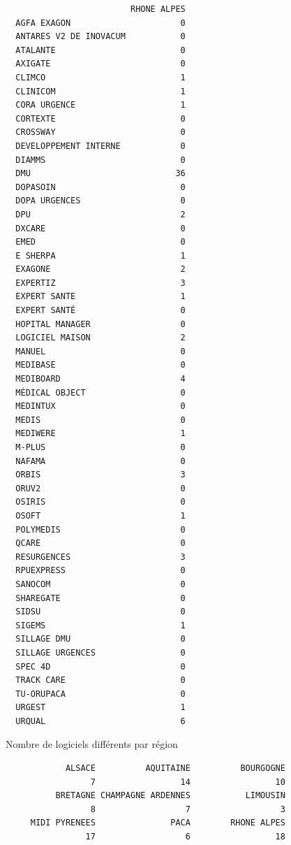\documentclass[]{article}
\begin{document}
\begin{verbatim}
                         RHONE ALPES
  AGFA EXAGON                      0
  ANTARES V2 DE INOVACUM           0
  ATALANTE                         0
  AXIGATE                          0
  CLIMCO                           1
  CLINICOM                         1
  CORA URGENCE                     1
  CORTEXTE                         0
  CROSSWAY                         0
  DEVELOPPEMENT INTERNE            0
  DIAMMS                           0
  DMU                             36
  DOPASOIN                         0
  DOPA URGENCES                    0
  DPU                              2
  DXCARE                           0
  EMED                             0
  E SHERPA                         1
  EXAGONE                          2
  EXPERTIZ                         3
  EXPERT SANTE                     1
  EXPERT SANTÉ                     0
  HOPITAL MANAGER                  0
  LOGICIEL MAISON                  2
  MANUEL                           0
  MEDIBASE                         0
  MEDIBOARD                        4
  MÉDICAL OBJECT                   0
  MEDINTUX                         0
  MEDIS                            0
  MEDIWERE                         1
  M-PLUS                           0
  NAFAMA                           0
  ORBIS                            3
  ORUV2                            0
  OSIRIS                           0
  OSOFT                            1
  POLYMEDIS                        0
  QCARE                            0
  RESURGENCES                      3
  RPUEXPRESS                       0
  SANOCOM                          0
  SHAREGATE                        0
  SIDSU                            0
  SIGEMS                           1
  SILLAGE DMU                      0
  SILLAGE URGENCES                 0
  SPEC 4D                          0
  TRACK CARE                       0
  TU-ORUPACA                       0
  URGEST                           1
  URQUAL                           6
\end{verbatim}

Nombre de logiciels différents par région

\begin{verbatim}
            ALSACE          AQUITAINE          BOURGOGNE 
                 7                 14                 10 
          BRETAGNE CHAMPAGNE ARDENNES           LIMOUSIN 
                 8                  7                  3 
     MIDI PYRENEES               PACA        RHONE ALPES 
                17                  6                 18 
\end{verbatim}
\end{document}
